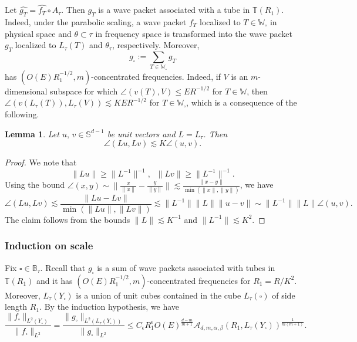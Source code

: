 \documentclass[11pt]{amsart}
\newtheorem{lemma}[theorem]{Lemma}
\theoremstyle{definition}
\theoremstyle{remark}
\numberwithin{equation}{section}
\renewcommand{\hat}{\widehat}
\renewcommand{\S}{\mathbb{S}}
\newcommand{\bB}{\mathbb{B}}
\newcommand{\W}{\mathbb{W}}
\newcommand{\T}{\mathbb{T}}
\newcommand{\sq}{\square}
\newcommand{\les}{\lesssim}
\newcommand{\eps}{\epsilon}
\begin{document}
Let $\hat{g_T} = \hat{f_T }\circ A_\tau$. Then $g_T$ is a wave packet associated with a tube in $\T(R_1)$.
Indeed, under the parabolic scaling, a wave packet $f_T$ localized to $T\in \W_\sq$ in physical space and $\theta \subset \tau$ in frequency space is transformed into the wave packet $g_T$ localized to $L_\tau(T)$ and $\theta_\tau$, respectively. Moreover, 
\[ g_\sq := \sum_{T\in \W_\sq} g_T\]
has $(O(E) R_1^{-1/2}, m)$-concentrated frequencies. Indeed, if $V$ is an $m$-dimensional subspace for which $\angle(v(T),V) \leq ER^{-1/2}$ for $T\in \W$, then $\angle(v(L_\tau(T)), L_\tau(V) ) \les KER^{-1/2}$ for $T\in \W_\sq$, which is a consequence of the following.  
\begin{lemma}
	Let $u, \, v \in \S^{d-1}$ be unit vectors and $L=L_\tau$. Then 
	\[ \angle(L  u, L  v) \les K \angle(u,v). \]
\end{lemma}
\begin{proof}
	We note that \[ \| L  u\| \geq \| L^{-1} \|^{-1}, \;\; \| L v\| \geq \| L^{-1} \|^{-1}. \] 
	Using the bound $\angle(x,y)  \sim \| \frac{x}{\|x\|} - \frac{y}{\|y\|} \| \les \frac{\| x-y\|}{\min(\|x\|, \|y\|)}$, we have
	\[ \angle(L  u, L  v) \les  \frac{\|L  u-Lv\|}{\min(\|L  u\|, \| Lv\|)}   \les \|L^{-1}\| \| L \| \| u - v\| \sim   \|L^{-1}\| \| L \| \angle( u, v).  \]
	The claim follows from the bounds $\| L  \| \les K^{-1}$ and $\| L^{-1} \| \les K^2$.
\end{proof}



\subsubsection{Induction on scale}\label{sec:induct}
Fix $\sq \in \bB_\tau$. 
Recall that $g_\sq$ is a sum of wave packets associated with tubes in $\T(R_1)$ and it has $(O(E)R_1^{-1/2},m)$-concentrated frequencies for $R_1 = R/K^2$. Moreover,  $L_\tau(Y_\sq)$ is a union of unit cubes contained in the cube $L_\tau(\sq)$ of side length $R_1$. By the induction hypothesis, we have
\begin{equation}\label{eqn:induction}
	 \frac{ \| f_\sq\|_{L^2(Y_\sq)}}{\| f_{\sq} \|_{L^2} } =\frac{ \| g_\sq\|_{L^2(L_{\tau}(Y_\sq))}}{\| g_{\sq} \|_{L^2} } \leq C_\eps R_1^\eps O(E)^\frac{d-m}{m+1} \mathcal{A}_{d,m,\alpha,\beta}(R_1,L_\tau(Y_\sq))^{\frac{1}{m(m+1)}}.  
\end{equation}
\end{document}
